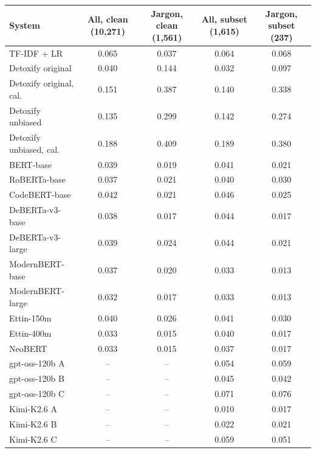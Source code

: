 \begin{tabular}{lcccc}
\toprule
System & All, clean (10,271) & Jargon, clean (1,561) & All, subset (1,615) & Jargon, subset (237) \\
\midrule
TF-IDF + LR & 0.065 & 0.037 & 0.064 & 0.068 \\
\midrule
Detoxify original & 0.040 & 0.144 & 0.032 & 0.097 \\
Detoxify original, cal. & 0.151 & 0.387 & 0.140 & 0.338 \\
Detoxify unbiased & 0.135 & 0.299 & 0.142 & 0.274 \\
Detoxify unbiased, cal. & 0.188 & 0.409 & 0.189 & 0.380 \\
\midrule
BERT-base & 0.039 & 0.019 & 0.041 & 0.021 \\
RoBERTa-base & 0.037 & 0.021 & 0.040 & 0.030 \\
CodeBERT-base & 0.042 & 0.021 & 0.046 & 0.025 \\
DeBERTa-v3-base & 0.038 & 0.017 & 0.044 & 0.017 \\
DeBERTa-v3-large & 0.039 & 0.024 & 0.044 & 0.021 \\
\midrule
ModernBERT-base & 0.037 & 0.020 & 0.033 & 0.013 \\
ModernBERT-large & 0.032 & 0.017 & 0.033 & 0.013 \\
Ettin-150m & 0.040 & 0.026 & 0.041 & 0.030 \\
Ettin-400m & 0.033 & 0.015 & 0.040 & 0.017 \\
NeoBERT & 0.033 & 0.015 & 0.037 & 0.017 \\
\midrule
gpt-oss-120b A & -- & -- & 0.054 & 0.059 \\
gpt-oss-120b B & -- & -- & 0.045 & 0.042 \\
gpt-oss-120b C & -- & -- & 0.071 & 0.076 \\
Kimi-K2.6 A & -- & -- & 0.010 & 0.017 \\
Kimi-K2.6 B & -- & -- & 0.022 & 0.021 \\
Kimi-K2.6 C & -- & -- & 0.059 & 0.051 \\
\bottomrule
\end{tabular}
